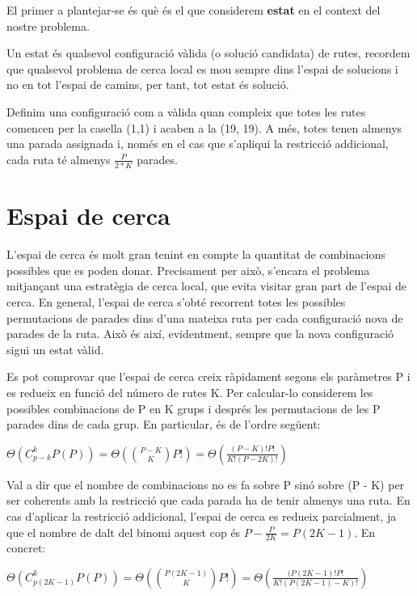 
El primer a plantejar-se és què és el que considerem \textbf{estat} en el context del nostre problema. 

Un estat és qualsevol configuració vàlida (o solució candidata) de rutes, recordem que qualsevol problema de cerca local es mou sempre dins l'espai de solucions i no en tot l'espai de camins, per tant, tot estat és solució. 

Definim una configuració com a vàlida quan compleix que totes les rutes comencen per la casella (1,1) i acaben a la (19, 19). A més, totes tenen almenys una parada assignada i, només en el cas que s'apliqui la restricció addicional, cada ruta té almenys $\frac{P}{2*K}$ parades.

\section{Espai de cerca} %
\label{sec:espaicerca}

L'espai de cerca és molt gran tenint en compte la quantitat de combinacions possibles que es poden donar. Precisament per això, s'encara el problema mitjançant una estratègia de cerca local, que evita visitar gran part de l'espai de cerca. En general, l'espai de cerca s'obté recorrent totes les possibles permutacions de parades dins d'una mateixa ruta per cada configuració nova de parades de la ruta. Això és així, evidentment, sempre que la nova configuració sigui un estat vàlid. 

Es pot comprovar que l'espai de cerca creix ràpidament segons els paràmetres P i es redueix en funció del número de rutes K. Per calcular-lo considerem les possibles combinacions de P en K grups i després les permutacions de les P parades dins de cada grup. En particular, és de l'ordre següent:

\begin{center}
\Large{$\Theta(C_{p-k}^{k} P(P)) = \Theta({P - K \choose K} P!) = \Theta(\frac{(P-K)!P!}{K!(P-2K)!}) $}
\end{center}

Val a dir que el nombre de combinacions no es fa sobre P sinó sobre (P - K) per ser coherents amb la restricció que cada parada ha de tenir almenys una ruta. En cas d'aplicar la restricció addicional, l'espai de cerca es redueix parcialment, ja que el nombre de dalt del binomi aquest cop és $P - \frac{P}{2K} = P(2K-1)$. En concret:

\begin{center}
\Large{$\Theta(C_{p(2K-1)}^{k} P(P)) = \Theta({P(2K-1) \choose K} P!) = \Theta(\frac{(P(2K-1)!P!}{K!(P(2K-1)-K)!})$ }
\end{center}

